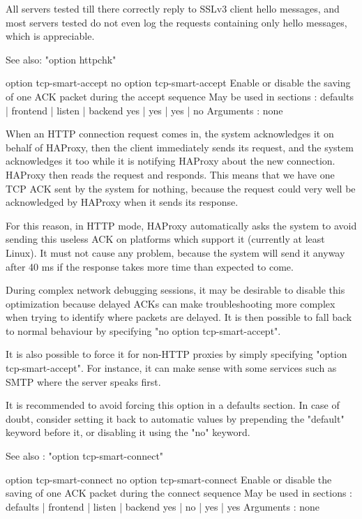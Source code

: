   All servers tested till there correctly reply to SSLv3 client hello messages,
  and most servers tested do not even log the requests containing only hello
  messages, which is appreciable.

  See also: "option httpchk"


option tcp-smart-accept
no option tcp-smart-accept
  Enable or disable the saving of one ACK packet during the accept sequence
  May be used in sections :   defaults | frontend | listen | backend
                                 yes   |    yes   |   yes  |    no
  Arguments : none

  When an HTTP connection request comes in, the system acknowledges it on
  behalf of HAProxy, then the client immediately sends its request, and the
  system acknowledges it too while it is notifying HAProxy about the new
  connection. HAProxy then reads the request and responds. This means that we
  have one TCP ACK sent by the system for nothing, because the request could
  very well be acknowledged by HAProxy when it sends its response.

  For this reason, in HTTP mode, HAProxy automatically asks the system to avoid
  sending this useless ACK on platforms which support it (currently at least
  Linux). It must not cause any problem, because the system will send it anyway
  after 40 ms if the response takes more time than expected to come.

  During complex network debugging sessions, it may be desirable to disable
  this optimization because delayed ACKs can make troubleshooting more complex
  when trying to identify where packets are delayed. It is then possible to
  fall back to normal behaviour by specifying "no option tcp-smart-accept".

  It is also possible to force it for non-HTTP proxies by simply specifying
  "option tcp-smart-accept". For instance, it can make sense with some services
  such as SMTP where the server speaks first.

  It is recommended to avoid forcing this option in a defaults section. In case
  of doubt, consider setting it back to automatic values by prepending the
  "default" keyword before it, or disabling it using the "no" keyword.

  See also : "option tcp-smart-connect"


option tcp-smart-connect
no option tcp-smart-connect
  Enable or disable the saving of one ACK packet during the connect sequence
  May be used in sections :   defaults | frontend | listen | backend
                                 yes   |    no    |   yes  |   yes
  Arguments : none

